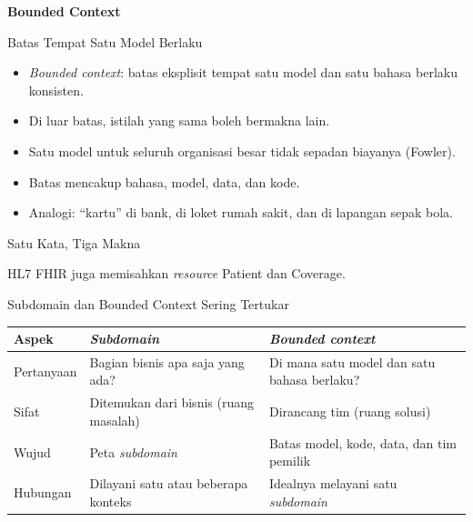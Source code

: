 \documentclass[aspectratio=169, table, 12pt]{beamer}
\begin{document}
\begin{frame}{\hfill}
  \centering
  \Huge{\textbf{Bounded Context}}
\end{frame}

\begin{frame}{{\Large Batas Tempat Satu Model Berlaku}}
  \vspace{10pt}
  \begin{itemize}
    \item \textit{Bounded context}: batas eksplisit tempat satu model dan satu
          bahasa berlaku konsisten.
    \item Di luar batas, istilah yang sama boleh bermakna lain.
    \item Satu model untuk seluruh organisasi besar tidak sepadan biayanya
          (Fowler).
    \item Batas mencakup bahasa, model, data, dan kode.
    \item Analogi: ``kartu'' di bank, di loket rumah sakit, dan di lapangan sepak
          bola.
  \end{itemize}
\end{frame}

\begin{frame}{{\Large Satu Kata, Tiga Makna}}
  \centering

  \vspace{4pt}
  {\small HL7 FHIR juga memisahkan \textit{resource} Patient dan Coverage.}
\end{frame}

\begin{frame}{{\Large Subdomain dan Bounded Context Sering Tertukar}}
  \footnotesize
  \begin{tabularx}{\textwidth}{>{\raggedright\arraybackslash}p{2.6cm}
      >{\raggedright\arraybackslash}X >{\raggedright\arraybackslash}X}
    \hline
    \textbf{Aspek} & \textbf{\textit{Subdomain}} & \textbf{\textit{Bounded context}} \\
    \hline
    Pertanyaan & Bagian bisnis apa saja yang ada? & Di mana satu model dan satu
      bahasa berlaku? \\
    \hline
    Sifat & Ditemukan dari bisnis (ruang masalah) & Dirancang tim (ruang solusi) \\
    \hline
    Wujud & Peta \textit{subdomain} & Batas model, kode, data, dan tim pemilik \\
    \hline
    Hubungan & Dilayani satu atau beberapa konteks & Idealnya melayani satu
      \textit{subdomain} \\
    \hline
  \end{tabularx}
\end{frame}
\end{document}
